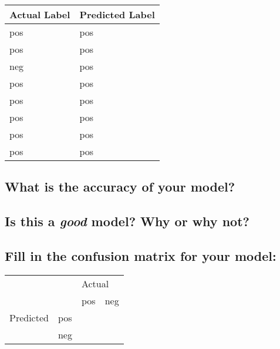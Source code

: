 \documentclass{article}
\begin{document}
\begin{table}[!ht]
\large
    \centering
    \begin{tabular}{|l|l|}
    \hline
        Actual Label & Predicted Label \\ \hline
        pos & pos \\ \hline
        pos & pos \\ \hline
        neg & pos \\ \hline
        pos & pos \\ \hline
        pos & pos \\ \hline
        pos & pos \\ \hline
        pos & pos \\ \hline
        pos & pos \\ \hline
    \end{tabular}
\end{table}

\subsection{What is the accuracy of your model?}
\vspace{1in}

\subsection{Is this a \textit{good} model? Why or why not?}
\vspace{1in}

\subsection{Fill in the confusion matrix for your model:}

\def\arraystretch{1.5}
\begin{table}[!h]
\large
\centering
\begin{tabular}{|ll|ll|}
\hline
                             &     & \multicolumn{2}{l|}{Actual} \\ \cline{3-4} 
                             &     & \multicolumn{1}{l|}{pos} & neg \\ \hline
\multicolumn{1}{|l|}{Predicted} & pos & \multicolumn{1}{l|}{}    &     \\ \cline{2-4} 
\multicolumn{1}{|l|}{}       & neg & \multicolumn{1}{l|}{}    &     \\ \hline
\end{tabular}
\label{undefined}
\end{table}
\end{document}
